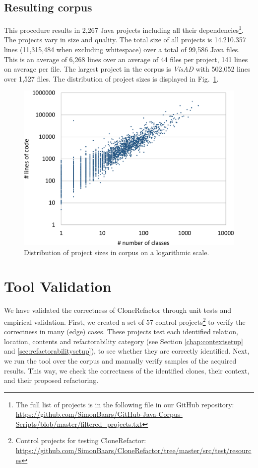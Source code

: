 \subsection{Resulting corpus}
This procedure results in 2,267 Java projects including all their dependencies\footnote{The full list of projects is in the following file in our GitHub repository: \url{https://github.com/SimonBaars/GitHub-Java-Corpus-Scripts/blob/master/filtered_projects.txt}}. The projects vary in size and quality. The total size of all projects is 14.210.357 lines (11,315,484 when excluding whitespace) over a total of 99,586 Java files. This is an average of 6,268 lines over an average of 44 files per project, 141 lines on average per file. The largest project in the corpus is \textit{VisAD} with 502,052 lines over 1,527 files. The distribution of project sizes is displayed in Fig.~\ref{fig:dist}.

\begin{figure}[H]
  \centering
  \includegraphics[width=0.65\columnwidth]{img/dist2}
  \caption{Distribution of project sizes in corpus on a logarithmic scale.}
  \label{fig:dist}
\end{figure}

\section{Tool Validation}
We have validated the correctness of CloneRefactor through unit tests and empirical validation. First, we created a set of 57 control projects\footnote{Control projects for testing CloneRefactor: \url{https://github.com/SimonBaars/CloneRefactor/tree/master/src/test/resources}} to verify the correctness in many (edge) cases. These projects test each identified relation, location, contents and refactorability category (see Section \ref{chap:contextsetup} and \ref{sec:refactorabilitysetup}), to see whether they are correctly identified. Next, we run the tool over the corpus and manually verify samples of the acquired results. This way, we check the correctness of the identified clones, their context, and their proposed refactoring.

